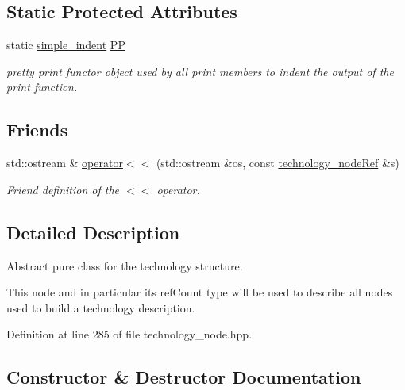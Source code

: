 \subsection*{Static Protected Attributes}
\begin{DoxyCompactItemize}
\item 
static \hyperlink{classsimple__indent}{simple\+\_\+indent} \hyperlink{structtechnology__node_ae6edfff0ccd2700b5de9fb538536977a}{PP}
\begin{DoxyCompactList}\small\item\em pretty print functor object used by all print members to indent the output of the print function. \end{DoxyCompactList}\end{DoxyCompactItemize}
\subsection*{Friends}
\begin{DoxyCompactItemize}
\item 
std\+::ostream \& \hyperlink{structtechnology__node_a4ec81768b4a21484c4deed5c77d4bd8e}{operator$<$$<$} (std\+::ostream \&os, const \hyperlink{technology__node_8hpp_a33dd193b7bd6b987bf0d8a770a819fa7}{technology\+\_\+node\+Ref} \&s)
\begin{DoxyCompactList}\small\item\em Friend definition of the $<$$<$ operator. \end{DoxyCompactList}\end{DoxyCompactItemize}


\subsection{Detailed Description}
Abstract pure class for the technology structure. 

This node and in particular its ref\+Count type will be used to describe all nodes used to build a technology description. 

Definition at line 285 of file technology\+\_\+node.\+hpp.



\subsection{Constructor \& Destructor Documentation}
\mbox{\label{structtechnology__node_a2a834a84dec715b32269951a618404a9}} 
